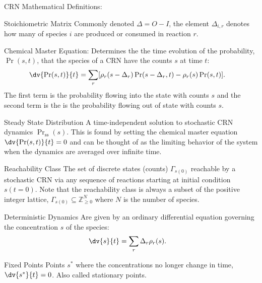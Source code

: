 \begin{breakout}[label=box:crn:definitions]{CRN Mathematical Definitions:}
  \begin{definition}{Stoichiometric Matrix}
    Commonly denoted $\Delta = O - I$, the element $\Delta_{i, r}$ denotes how many of species $i$ are produced or consumed in reaction $r$.
  \end{definition}
    
  \begin{definition}{Chemical Master Equation:}
    Determines the the time evolution of the probability, $\Pr(s, t)$, that the species of a CRN have the counts $s$ at time $t$:
    \begin{align}
      \label{eq:crn:cme2}
      \dv{\Pr(s, t)}{t} &=
        \sum_r [  \rho_r(s - \Delta_r) \Pr(s - \Delta_r, t)
                - \rho_r(s) \Pr(s, t)].
    \end{align}
    The first term is the probability flowing into the state with counts $s$ and the second term is the is the probability flowing out of state with counts $s$.
  \end{definition}
    
  \begin{definition}{Steady State Distribution}
    A time-independent solution to stochastic CRN dynamics $\Pr_{\mathrm{ss}}(s)$.
    This is found by setting the chemical master equation $\dv{\Pr(s, t)}{t} = 0$ and can be thought of as the limiting behavior of the system when the dynamics are averaged over infinite time.
  \end{definition}
    
  \begin{definition}{Reachability Class}
    The set of discrete states (counts) $\Gamma_{s(0)}$ reachable by a stochastic CRN via any sequence of reactions starting at initial condition $s(t=0)$.
    Note that the reachability class is always a subset of the positive integer lattice, $\Gamma_{s(0)} \subseteq \mathbb{Z}_{\geq 0}^N$ where $N$ is the number of species.
  \end{definition}
    
  \begin{definition}{Deterministic Dynamics}
    Are given by an ordinary differential equation governing the concentration $s$ of the species:
    \begin{align*}
      \dv{s}{t} &= \sum_r \Delta_r \rho_r(s).
    \end{align*}
  \end{definition}
    
  \begin{definition}{Fixed Points}
    Points $s^*$ where the concentrations no longer change in time, $\dv{s^*}{t} = 0$.
    Also called stationary points.
  \end{definition}
    

\end{breakout}
